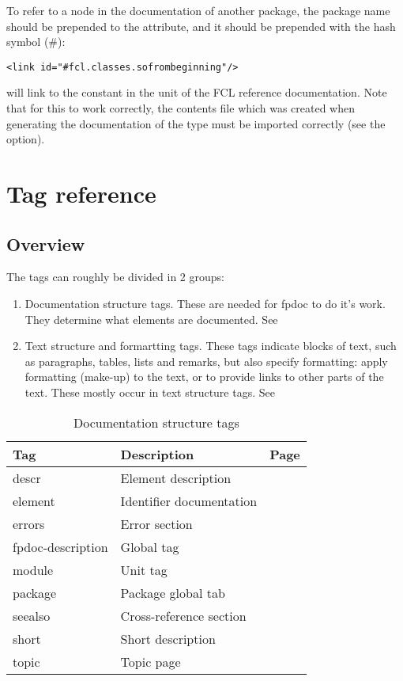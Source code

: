 To refer to a node in the documentation of another package, the package name
should be prepended to the  attribute, and it should be prepended
with the hash symbol (\#):
\begin{verbatim}
<link id="#fcl.classes.sofrombeginning"/>
\end{verbatim}
will link to the constant  in the  unit
of the FCL reference documentation. Note that for this to work correctly,
the contents file which was created when generating the documentation of 
the type must be imported correctly (see the  option).

\section{Tag reference}
\subsection{Overview}
The tags can roughly be divided in 2 groups:
\begin{enumerate}
\item Documentation structure tags. These are needed for fpdoc to do it's
work. They determine what elements are documented. See 
\item Text structure and formartting tags. These tags indicate blocks of text, such as
paragraphs, tables, lists and remarks, but also specify formatting: apply formatting (make-up) 
to the text, or to provide links to other parts of the text. These mostly occur in
text structure tags. See 
\end{enumerate}

\begin{table}[ht]
\caption{Documentation structure tags}\label{tab:structtags}
\begin{tabularx}{\textwidth}{lXr}
Tag & Description & Page \\ \hline
descr & Element description & \pageref{tag:descr} \\
element & Identifier documentation & \pageref{tag:element} \\
errors  & Error section & \pageref{tag:errors} \\
fpdoc-description & Global tag & \pageref{tag:fpdocdescription} \\
module & Unit tag & \pageref{tag:module} \\
package & Package global tab & \pageref{tag:package} \\
seealso & Cross-reference section & \pageref{tag:seealso} \\
short & Short description & \pageref{tag:short} \\ 
topic & Topic page & \pageref{tag:topic} \\ \hline
\end{tabularx}
\end{table}

